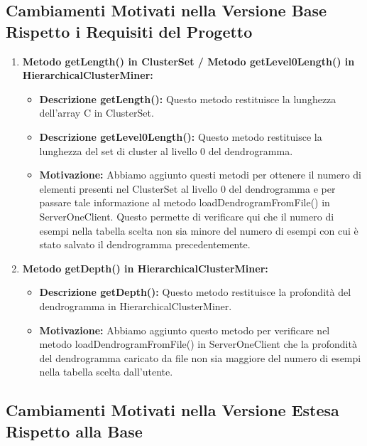 \subsection{Cambiamenti Motivati nella Versione Base Rispetto i Requisiti del Progetto}

\begin{enumerate}
    \item \textbf{Metodo getLength() in ClusterSet / Metodo getLevel0Length() in HierarchicalClusterMiner:}
    \begin{itemize}
        \item \textbf{Descrizione getLength():} Questo metodo restituisce la lunghezza dell'array C in ClusterSet.
        \item \textbf{Descrizione getLevel0Length():} Questo metodo restituisce la lunghezza del set di cluster al livello 0 del dendrogramma.
        \item \textbf{Motivazione:} Abbiamo aggiunto questi metodi per ottenere il numero di elementi presenti nel ClusterSet al livello 0 del dendrogramma e per passare tale informazione al metodo loadDendrogramFromFile() in ServerOneClient. Questo permette di verificare qui che il numero di esempi nella tabella scelta non sia minore del numero di esempi con cui è stato salvato il dendrogramma precedentemente.
    \end{itemize}
    
    \item \textbf{Metodo getDepth() in HierarchicalClusterMiner:}
    \begin{itemize}
        \item \textbf{Descrizione getDepth():} Questo metodo restituisce la profondità del dendrogramma in HierarchicalClusterMiner.
        \item \textbf{Motivazione:} Abbiamo aggiunto questo metodo per verificare nel metodo loadDendrogramFromFile() in ServerOneClient che la profondità del dendrogramma caricato da file non sia maggiore del numero di esempi nella tabella scelta dall'utente.
    \end{itemize}
\end{enumerate}

\subsection{Cambiamenti Motivati nella Versione Estesa Rispetto alla Base}

